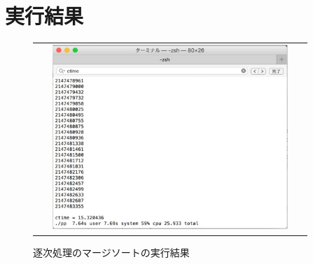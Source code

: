 \documentclass[11pt,a4paper]{jsarticle}
\begin{document}
\section*{実行結果}
\begin{figure}[htbp]
 \begin{tabular}{c}
  \begin{minipage}{0.5\hsize}
   \begin{center}
   \includegraphics[width=10cm,height=7cm]{nonpp-crop.pdf}
   \caption{逐次処理のマージソートの実行結果}
   \end{center}
  \end{minipage}
 \end{tabular}
\end{figure}
\end{document}
